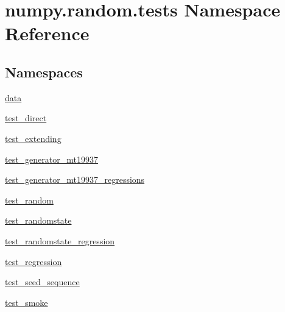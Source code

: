 \hypertarget{namespacenumpy_1_1random_1_1tests}{}\section{numpy.\+random.\+tests Namespace Reference}
\label{namespacenumpy_1_1random_1_1tests}
\subsection*{Namespaces}
\begin{DoxyCompactItemize}
\item 
 \hyperlink{namespacenumpy_1_1random_1_1tests_1_1data}{data}
\item 
 \hyperlink{namespacenumpy_1_1random_1_1tests_1_1test__direct}{test\+\_\+direct}
\item 
 \hyperlink{namespacenumpy_1_1random_1_1tests_1_1test__extending}{test\+\_\+extending}
\item 
 \hyperlink{namespacenumpy_1_1random_1_1tests_1_1test__generator__mt19937}{test\+\_\+generator\+\_\+mt19937}
\item 
 \hyperlink{namespacenumpy_1_1random_1_1tests_1_1test__generator__mt19937__regressions}{test\+\_\+generator\+\_\+mt19937\+\_\+regressions}
\item 
 \hyperlink{namespacenumpy_1_1random_1_1tests_1_1test__random}{test\+\_\+random}
\item 
 \hyperlink{namespacenumpy_1_1random_1_1tests_1_1test__randomstate}{test\+\_\+randomstate}
\item 
 \hyperlink{namespacenumpy_1_1random_1_1tests_1_1test__randomstate__regression}{test\+\_\+randomstate\+\_\+regression}
\item 
 \hyperlink{namespacenumpy_1_1random_1_1tests_1_1test__regression}{test\+\_\+regression}
\item 
 \hyperlink{namespacenumpy_1_1random_1_1tests_1_1test__seed__sequence}{test\+\_\+seed\+\_\+sequence}
\item 
 \hyperlink{namespacenumpy_1_1random_1_1tests_1_1test__smoke}{test\+\_\+smoke}
\end{DoxyCompactItemize}
